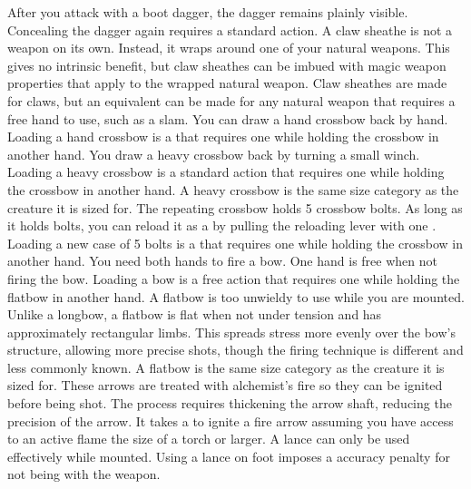         After you attack with a boot dagger, the dagger remains plainly visible.
        Concealing the dagger again requires a standard action.
         A claw sheathe is not a weapon on its own.
        Instead, it wraps around one of your natural weapons.
        This gives no intrinsic benefit, but claw sheathes can be imbued with magic weapon properties that apply to the wrapped natural weapon.
        Claw sheathes are made for claws, but an equivalent can be made for any natural weapon that requires a free hand to use, such as a slam.
         You can draw a hand crossbow back by hand. Loading a hand crossbow is a  that requires one  while holding the crossbow in another hand.
         You draw a heavy crossbow back by turning a small winch.
        Loading a heavy crossbow is a standard action that requires one  while holding the crossbow in another hand.
        A heavy crossbow is the same size category as the creature it is sized for.
         The repeating crossbow holds 5 crossbow bolts. As long as it holds bolts, you can reload it as a  by pulling the reloading lever with one . Loading a new case of 5 bolts is a  that requires one  while holding the crossbow in another hand.
         You need both hands to fire a bow. One hand is free when not firing the bow. Loading a bow is a free action that requires one  while holding the flatbow in another hand. A flatbow is too unwieldy to use while you are mounted.
        Unlike a longbow, a flatbow is flat when not under tension and has approximately rectangular limbs.
        This spreads stress more evenly over the bow's structure, allowing more precise shots, though the firing technique is different and less commonly known.
        A flatbow is the same size category as the creature it is sized for.
         These arrows are treated with alchemist's fire so they can be ignited before being shot.
        The process requires thickening the arrow shaft, reducing the precision of the arrow.
        It takes a  to ignite a fire arrow assuming you have access to an active flame the size of a torch or larger.
         A lance can only be used effectively while mounted.
        Using a lance on foot imposes a  accuracy penalty for not being  with the weapon.
